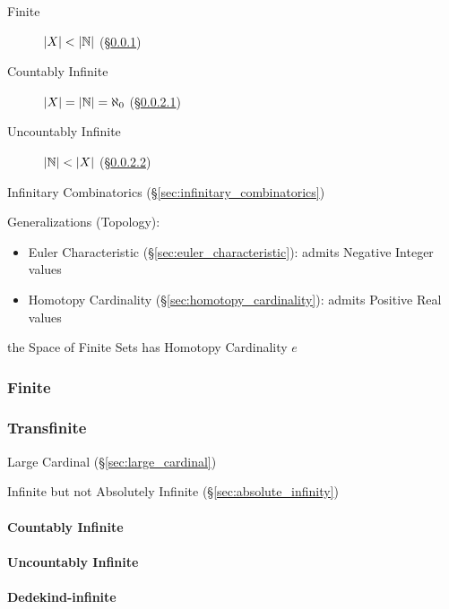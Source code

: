 \begin{description}
\item [Finite] $|X| < |\mathbb{N}|$ (\S\ref{sec:finite_cardinality})
\item [Countably Infinite] $|X| = |\mathbb{N}| = \aleph_0$
  (\S\ref{sec:countably_infinite})
\item [Uncountably Infinite] $|\mathbb{N}| < |X|$
  (\S\ref{sec:uncountably_infinite})
\end{description}

Infinitary Combinatorics (\S\ref{sec:infinitary_combinatorics})


\asterism


Generalizations (Topology):

\begin{itemize}
  \item Euler Characteristic (\S\ref{sec:euler_characteristic}):
    admits Negative Integer values
  \item Homotopy Cardinality (\S\ref{sec:homotopy_cardinality}):
    admits Positive Real values
\end{itemize}

the Space of Finite Sets has Homotopy Cardinality $e$



\subsubsection{Finite}\label{sec:finite_cardinality}

\subsubsection{Transfinite}\label{sec:transfinite}

Large Cardinal (\S\ref{sec:large_cardinal})

Infinite but not Absolutely Infinite (\S\ref{sec:absolute_infinity})



\paragraph{Countably Infinite}\label{sec:countably_infinite}\hfill

\paragraph{Uncountably Infinite}\label{sec:uncountably_infinite}\hfill

\paragraph{Dedekind-infinite}\label{sec:dedekind_infinite}\hfill




